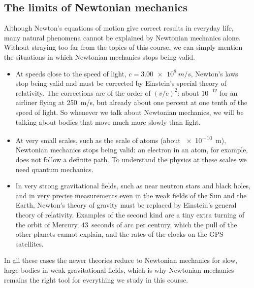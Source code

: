 \documentclass[11pt,a4paper]{article}
\begin{document}
\subsection{The limits of Newtonian mechanics}\label{sec:limits}

Although Newton's equations of motion give correct results in everyday life, many natural
phenomena cannot be explained by Newtonian mechanics alone. Without straying too
far from the topics of this course, we can simply mention the situations in which Newtonian
mechanics stops being valid.
\begin{itemize}
  \item At speeds close to the speed of light, $c = \qty{3.00e8}{m/s}$, Newton's laws stop being
    valid and must be corrected by Einstein's special theory of relativity. The corrections are of
    the order of $(v/c)^2$: about $10^{-12}$ for an airliner flying at \qty{250}{m/s}, but
    already about one percent at one tenth of the speed of light. So whenever we talk about
    Newtonian mechanics, we will be talking about bodies that move much more slowly than light.
  \item At very small scales, such as the scale of atoms (about \qty{e-10}{m}), Newtonian mechanics
    stops being valid: an electron in an atom, for example, does not follow a definite path. To
    understand the physics at these scales we need quantum mechanics.
  \item In very strong gravitational fields, such as near neutron stars and black holes, and in very
    precise measurements even in the weak fields of the Sun and the Earth, Newton's theory of
    gravity must be replaced by Einstein's general theory of relativity. Examples of the second kind
    are a tiny extra turning of the orbit of Mercury, 43~seconds of arc per century, which the pull
    of the other planets cannot explain, and the rates of the clocks on the GPS satellites.
\end{itemize}
In all these cases the newer theories reduce to Newtonian mechanics for slow, large bodies in weak
gravitational fields, which is why Newtonian mechanics remains the right tool for everything we
study in this course.

\end{document}
